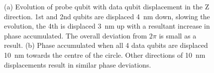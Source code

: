 \begin{figure}[H]
	\caption[oddeven]{(a) Evolution of probe qubit with data qubit displacement in the Z direction. 1st and 2nd qubits are displaced \SI{4}{\nano\metre} down, slowing the evolution, the 4th is displaced \SI{3}{\nano\metre} up with a resultant increase in phase accumulated. The overall deviation from $2\pi$ is small as a result. (b) Phase accumulated when all 4 data qubits are displaced \SI{10}{\nano\metre} towards the centre of the circle. Other directions of \SI{10}{\nano\metre} displacements result in similar phase deviations.}
	\label{fig:overall_displacement}
\end{figure}



